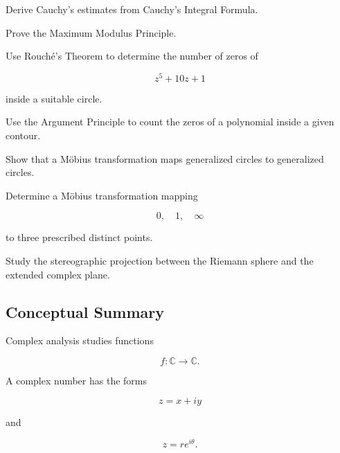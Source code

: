 \begin{exercise}[4]
Derive Cauchy's estimates from Cauchy's Integral Formula.
\end{exercise}

\begin{exercise}[4]
Prove the Maximum Modulus Principle.
\end{exercise}

\begin{exercise}[4]
Use Rouch\'e's Theorem to determine the number of zeros of

\[
z^5+10z+1
\]

inside a suitable circle.
\end{exercise}

\begin{exercise}[4]
Use the Argument Principle to count the zeros of a polynomial inside a
given contour.
\end{exercise}

\begin{exercise}[4]
Show that a M\"obius transformation maps generalized circles to
generalized circles.
\end{exercise}

\begin{exercise}[4]
Determine a M\"obius transformation mapping

\[
0,\quad1,\quad\infty
\]

to three prescribed distinct points.
\end{exercise}

\begin{exercise}[4]
Study the stereographic projection between the Riemann sphere and the
extended complex plane.
\end{exercise}

\subsection{Conceptual Summary}
\label{subsec:complex-analysis-summary}

Complex analysis studies functions

\[
\boxed{
f:\mathbb{C}\to\mathbb{C}.
}
\]

A complex number has the forms

\[
\boxed{
z=x+iy
}
\]

and

\[
\boxed{
z=re^{i\theta}.
}
\]

